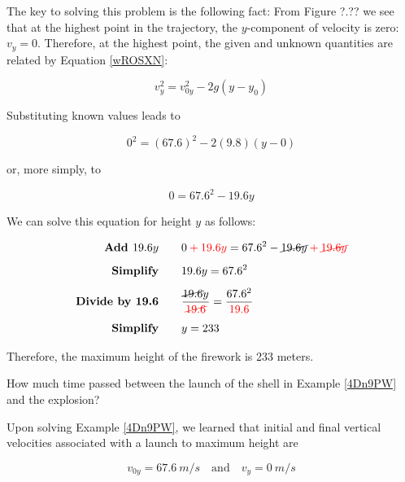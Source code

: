 \documentclass[main.tex]{subfiles}
\begin{document}
The key to solving this problem is the following fact: From Figure ?.?? we see that at the highest point in the trajectory, the $y$-component of velocity is zero: $v_y = 0$. Therefore, at the highest point, the given and unknown quantities are related by Equation \eqref{wROSXN}:

\begin{equation*}
    v_y^2 = v_{0y}^2 - 2 g \left(y-y_0\right)
\end{equation*}

Substituting known values leads to

\begin{equation*}
    0^2 = \left(67.6\right)^2 - 2 (9.8) \left(y - 0\right)
\end{equation*}

or, more simply, to

\begin{equation*}
    0 = 67.6^2 - 19.6 y
\end{equation*}

We can solve this equation for height $y$ as follows:

\begin{align*}
    \textbf{Add $19.6 y$} \qquad & 0 \mathbin{\color{red} +} \textcolor{red}{19.6 y} = 67.6^2 - \cancel{19.6 y} \mathbin{\color{red} +} \textcolor{red}{\cancel{19.6 y}}\\[1ex]
    \textbf{Simplify} \qquad & 19.6 y = 67.6^2\\[1ex]
    \textbf{Divide by 19.6} \qquad & \frac{\cancel{19.6} y}{\textcolor{red}{\cancel{19.6}}} = \frac{67.6^2}{\textcolor{red}{19.6}}\\[1ex]
    \textbf{Simplify} \qquad & y = 233
\end{align*}

Therefore, the maximum height of the firework is 233 meters.

\endsolution

\begin{example} \label{t57osh}
    How much time passed between the launch of the shell in Example \ref{4Dn9PW} and the explosion?
\end{example}

\Solution
Upon solving Example \ref{4Dn9PW}, we learned that initial and final vertical velocities associated with a launch to maximum height are

\begin{equation*}
    v_{0y} = \SI{67.6}{m/s} \quad \text{and} \quad v_y = \SI{0}{m/s}
\end{equation*}
\end{document}
